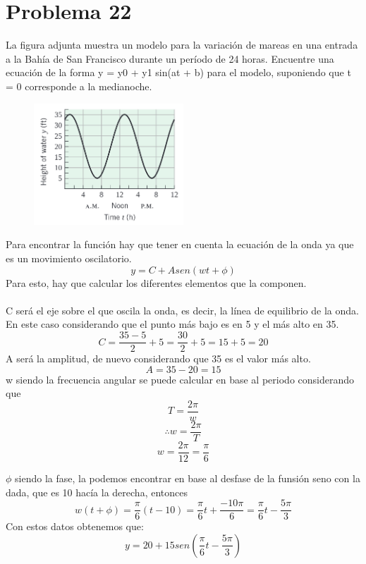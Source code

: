 \documentclass[12pt]{article}
\begin{document}
\section{Problema 22}
La figura adjunta muestra un modelo para la variación de mareas en una entrada a la Bahía de San Francisco durante un período de 24 horas.
Encuentre una ecuación de la forma y = y0 + y1 sin(at + b) para el
modelo, suponiendo que t = 0 corresponde a la medianoche.
\begin{figure}[h]
\centering
\includegraphics[width=0.5\textwidth]{img/prob22.png}
\end{figure}
Para encontrar la función hay que tener en cuenta la ecuación de la onda ya que es un movimiento oscilatorio.
\[
y = C + A sen (wt+\phi) 
\]
Para esto, hay que calcular los diferentes elementos que la componen. \\ \\
C será el eje sobre el que oscila la onda, es decir, la línea de equilibrio de la onda. En este caso considerando que el punto más bajo es en 5 y el más alto en 35.
\[
C = \frac{35-5}{2} + 5 = \frac{30}{2}+ 5 =15 + 5 = 20
\]
A será la amplitud, de nuevo considerando que 35 es el valor más alto.
\[
A = 35 - 20 = 15
\]
w siendo la frecuencia angular se puede calcular en base al periodo considerando que
\[
T=\frac{2\pi}{w}
\]
\[
\therefore w = \frac{2\pi}{T} 
\]
\[
 w = \frac{2\pi}{12} = \frac{\pi}{6}
\]

$\phi$ siendo la fase, la podemos encontrar en base al desfase de la funsión seno con la dada, que es 10 hacía la derecha, entonces
\[
 w(t+\phi)  = \frac{\pi}{6}(t-10) = \frac{\pi}{6}t+\frac{-10\pi}{6} = \frac{\pi}{6}t-\frac{5\pi}{3} 
\]
Con estos datos obtenemos que: 
\[
y = 20 + 15 sen (\frac{\pi}{6}t-\frac{5\pi}{3}) 
\]
\end{document}
